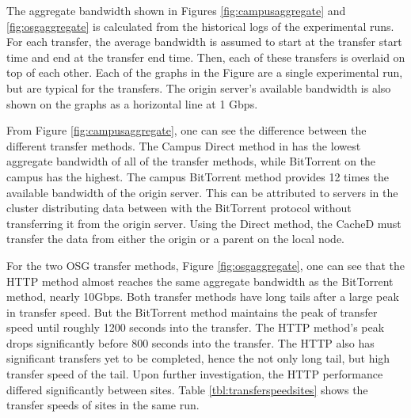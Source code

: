 %
%
%	

The aggregate bandwidth shown in Figures \ref{fig:campusaggregate} and \ref{fig:osgaggregate} is calculated from the historical logs of the experimental runs.  For each transfer, the average bandwidth is assumed to start at the transfer start time and end at the transfer end time.  Then, each of these transfers is overlaid on top of each other.  Each of the graphs in the Figure are a single experimental run, but are typical for the transfers.  The origin server's available bandwidth is also shown on the graphs as a horizontal line at 1 Gbps.

From Figure \ref{fig:campusaggregate}, one can see the difference between the different transfer methods.  The Campus Direct method in has the lowest aggregate bandwidth of all of the transfer methods, while BitTorrent on the campus has the highest.  The campus BitTorrent method provides 12 times the available bandwidth of the origin server.  This can be attributed to servers in the cluster distributing data between with the BitTorrent protocol without transferring it from the origin server.  Using the Direct method, the CacheD must transfer the data from either the origin or a parent on the local node.

For the two OSG transfer methods, Figure \ref{fig:osgaggregate}, one can see that the HTTP method almost reaches the same aggregate bandwidth as the BitTorrent method, nearly 10Gbps.  Both transfer methods have long tails after a large peak in transfer speed.  But the BitTorrent method maintains the peak of transfer speed until roughly 1200 seconds into the transfer.  The HTTP method's peak drops significantly before 800 seconds into the transfer.  The HTTP also has significant transfers yet to be completed, hence the not only long tail, but high transfer speed of the tail.  Upon further investigation, the HTTP performance differed significantly between sites.  Table \ref{tbl:transferspeedsites} shows the transfer speeds of sites in the same run.

